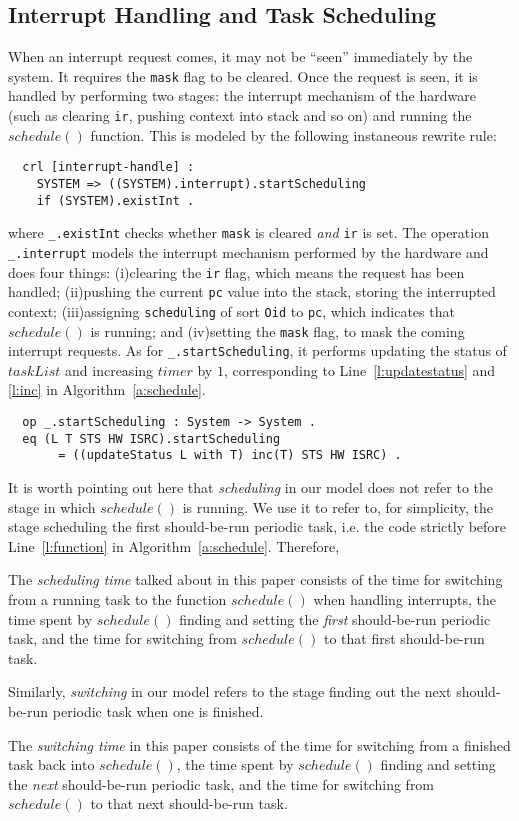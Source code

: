 \documentclass{llncs}
\begin{document}
\subsection{Interrupt Handling and Task Scheduling}
\label{ss:inthandling}
When an interrupt request comes, it may not be ``seen'' immediately by
the system. It requires the \verb|mask| flag to be cleared. Once the
request is seen, it is handled by performing two stages: the interrupt
mechanism of the hardware (such as clearing \verb|ir|, pushing context
into stack and so on) and running the $schedule()$ function. This is
modeled by the following instaneous rewrite rule:
\begin{verbatim}
  crl [interrupt-handle] :
    SYSTEM => ((SYSTEM).interrupt).startScheduling
    if (SYSTEM).existInt .
\end{verbatim}
where \verb|_.existInt| checks whether \verb|mask| is cleared
\emph{and} \verb|ir| is set. The operation \verb|_.interrupt| models
the interrupt mechanism performed by the hardware and does four
things: (i)clearing the \verb|ir| flag, which means the request has
been handled; (ii)pushing the current \verb|pc| value into the stack,
storing the interrupted context; (iii)assigning \verb|scheduling| of
sort \verb|Oid| to \verb|pc|, which indicates that $schedule()$ is
running; and (iv)setting the \verb|mask| flag, to mask the coming
interrupt requests. As for \verb|_.startScheduling|, it performs
updating the status of $taskList$ and increasing $timer$ by $1$,
corresponding to Line~\ref{l:updatestatus} and \ref{l:inc} in
Algorithm~\ref{a:schedule}.
\begin{verbatim}
  op _.startScheduling : System -> System .
  eq (L T STS HW ISRC).startScheduling 
       = ((updateStatus L with T) inc(T) STS HW ISRC) .
\end{verbatim}

It is worth pointing out here that \emph{scheduling} in our model does
not refer to the stage in which $schedule()$ is running. We use it to
refer to, for simplicity, the stage scheduling the first should-be-run
periodic task, i.e.  the code strictly before Line~\ref{l:function} in
Algorithm~\ref{a:schedule}. Therefore,
\begin{definition}
  The \emph{scheduling time} talked about in this paper consists of
  the time for switching from a running task to the function
  $schedule()$ when handling interrupts, the time spent by
  $schedule()$ finding and setting the \emph{first} should-be-run
  periodic task, and the time for switching from $schedule()$ to that
  first should-be-run task.
\end{definition}
Similarly, \emph{switching} in our model refers to the stage finding
out the next should-be-run periodic task when one is finished.
\begin{definition}
  The \emph{switching time} in this paper consists of the time for
  switching from a finished task back into $schedule()$, the time
  spent by $schedule()$ finding and setting the \emph{next}
  should-be-run periodic task, and the time for switching from
  $schedule()$ to that next should-be-run task.
\end{definition}
\end{document}
